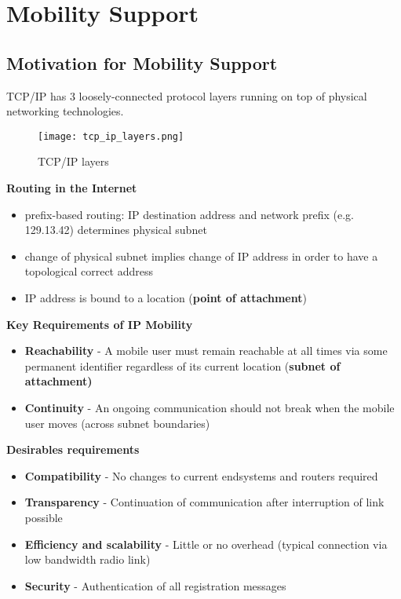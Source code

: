 \chapter{Mobility Support}
\label{mobility support}

\section{Motivation for Mobility Support}

TCP/IP has 3 loosely-connected protocol layers running on top of physical
networking technologies.

\begin{figure}[H]
  \centering
  \texttt{[image: tcp\_ip\_layers.png]}
  \caption{TCP/IP layers}
  \label{fig:tcpiplayers}
\end{figure}

\textbf{Routing in the Internet}

\begin{itemize}
  \item prefix-based routing: IP destination address and network prefix (e.g.
129.13.42) determines physical subnet
  \item change of physical subnet implies change of IP address in order to
have a topological correct address
  \item IP address is bound to a location (\textbf{point of attachment})
\end{itemize}

\textbf{Key Requirements of IP Mobility}

\begin{itemize}
  \item \textbf{Reachability} - A mobile user must remain reachable at all
times via some permanent identifier regardless of its current location
(\textbf{subnet of attachment)}
  \item \textbf{Continuity} - An ongoing communication should not break when
the mobile user moves (across subnet boundaries)
\end{itemize}

\textbf{Desirables requirements}

\begin{itemize}
  \item \textbf{Compatibility} - No changes to current endsystems and routers
required
  \item \textbf{Transparency} - Continuation of communication after
interruption of link possible
  \item \textbf{Efficiency and scalability} - Little or no overhead (typical
connection via low bandwidth radio link)
  \item \textbf{Security} - Authentication of all registration messages
\end{itemize}

